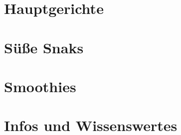 \documentclass[a4paper]{scrartcl}
\begin{document}
\section{Hauptgerichte} %











\section{Süße Snaks} %






\section{Smoothies} %


\section{Infos und Wissenswertes} %
	

\end{document}
